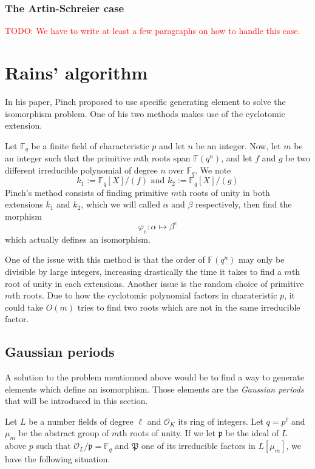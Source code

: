 \documentclass[12pt]{article}
\theoremstyle{plain}
\theoremstyle{definition}
\newcommand{\todo}[1]{\textcolor{red}{TODO: #1}}
\def\F{\ensuremath{\mathbb{F}}}
\newcounter{algorithm}
\begin{document}
\subsubsection{The Artin-Schreier case}
\label{sec:artin-schreier-case}

\todo{We have to write at least a few paragraphs on how to handle this case.}


\section{Rains' algorithm}

In his paper, Pinch \cite{} proposed to use specific generating element to solve
the isomorphism problem. One of his two methods makes use of the cyclotomic
extension.\par
Let $\F_q$ be a finite field of characteristic $p$ and let $n$ be an integer. 
Now, let $m$ be an integer such that the primitive $m$th roots span 
$\F(q^n)$, and let $f$ and $g$ be two different irreducible polynomial of
degree $n$ over $\F_q$. We note
\begin{equation}
k_1 := \F_q[X]/(f)\text{ and }k_2 := \F_q[X]/(g)
\end{equation}
Pinch's method consists of finding primitive $m$th roots of unity in both extensions
$k_1$ and $k_2$, which we will called $\alpha$ and $\beta$ respectively, then
find the morphism
\begin{equation}
\varphi_e : \alpha\longmapsto\beta^e
\end{equation}
which actually defines an isomorphism.\par
One of the issue with this method is that the order of $\F(q^n)$ may only be
divisible by large integers, increasing drastically the time it takes to find a 
$m$th root of unity in each extensions. Another issue is the random choice of
primitive $m$th roots. Due to how the cyclotomic polynomial factors in
charateristic $p$, it could take $O(m)$ tries to find two roots which are not in
the same irreducible factor.\par

\subsection{Gaussian periods}

A solution to the problem mentionned above would be to find a way to generate
elements which define an isomorphism. Those elements are the \emph{Gaussian
periods} that will be introduced in this section.\par
Let $L$ be a number fields of degree $\ell$ and $\mathcal{O}_{K}$ its ring of
integers. Let $q = p^{\ell}$ and $\mu_m$ be the abstract group of $m$th roots of
unity. If we let $\mathfrak{p}$ be the ideal of $L$ above $p$ such that
$\mathcal{O}_L/\mathfrak{p} = \F_q$ and $\mathfrak{P}$ one of its irreducible 
factors in $L[\mu_m]$, we have the following situation.
\end{document}
